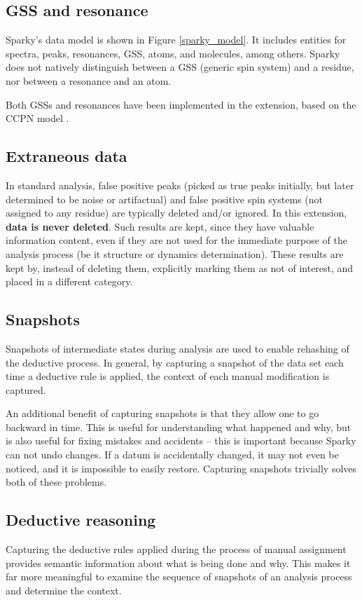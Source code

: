 \subsection*{GSS and resonance}
Sparky's data model is shown in Figure \ref{sparky_model}.  It includes 
entities for spectra, peaks, resonances, GSS, atoms, and molecules, among
others.  Sparky does not natively distinguish between a GSS (generic spin 
system) and a residue, nor between a resonance and an atom.

Both GSSs and resonances have been implemented in the extension, based 
on the CCPN model \cite{ccpn}.

\subsection*{Extraneous data}
In standard analysis, false positive peaks (picked as true peaks initially,
but later determined to be noise or artifactual) and false positive spin 
systems (not assigned to any residue) are typically deleted and/or ignored.
In this extension, \textbf{data is never deleted}.  Such results are kept,
since they have valuable information content, even if they are not used for
the immediate purpose of the analysis process (be it structure or dynamics
determination).  These results are kept by, instead of deleting them, 
explicitly marking them as not of interest, and placed in a different
category.

\subsection*{Snapshots}
Snapshots of intermediate states during analysis are used to enable rehashing
of the deductive process.  In general, by capturing a snapshot of the data set
each time a deductive rule is applied, the context of each manual modification
is captured.

An additional benefit of capturing snapshots is that they allow one to go 
backward in time.  This is useful for understanding what happened and
why, but is also useful for fixing mistakes and accidents -- this is
important because Sparky can not undo changes.
If a datum is accidentally changed, it may not even be noticed, and it is 
impossible to easily restore.  Capturing snapshots trivially solves both
of these problems.

\subsection*{Deductive reasoning}
Capturing the deductive rules applied during the process of manual assignment
provides semantic information about what is being done and why.  This makes it
far more meaningful to examine the sequence of snapshots of an analysis
process and determine the context.



